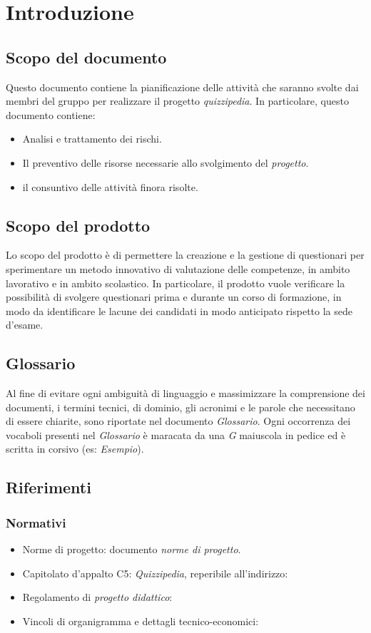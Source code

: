 \section{Introduzione}
\subsection{Scopo del documento}
Questo documento contiene la pianificazione delle attività che saranno svolte dai membri del gruppo \textit{\gruppo} per realizzare il
progetto \textit{quizzipedia}. In particolare, questo documento contiene:

	\begin{itemize}
		\item Analisi e trattamento dei rischi.
		\item Il preventivo delle risorse necessarie allo svolgimento del \textit{progetto}.
		\item il consuntivo delle attività finora risolte.
	\end{itemize}
	
\subsection{Scopo del prodotto}
Lo scopo del prodotto è di permettere la creazione e la gestione di questionari per sperimentare un metodo innovativo di valutazione delle competenze, in ambito lavorativo e in ambito scolastico. In particolare, il prodotto vuole verificare la possibilità di svolgere questionari prima e durante un corso di formazione, in modo da identificare le lacune dei candidati in modo anticipato rispetto la sede d'esame.
\subsection{Glossario}
Al fine di evitare ogni ambiguità di linguaggio e massimizzare la comprensione dei documenti, i termini tecnici, di dominio, gli acronimi e le parole che necessitano di essere chiarite, sono riportate nel documento \textit{Glossario}. Ogni occorrenza dei vocaboli presenti nel \textit{Glossario} è maracata da una \textit{G} maiuscola in pedice ed è scritta in corsivo (es: \textit{Esempio}).
\subsection{Riferimenti}
\subsubsection{Normativi}
	\begin{itemize}
		\item Norme di progetto: documento \textit{norme di progetto}.
		\item Capitolato d'appalto C5: \textit{Quizzipedia}, reperibile all'indirizzo:
		\item Regolamento di \textit{progetto didattico}:
		\item Vincoli di organigramma e dettagli tecnico-economici:
	\end{itemize}
